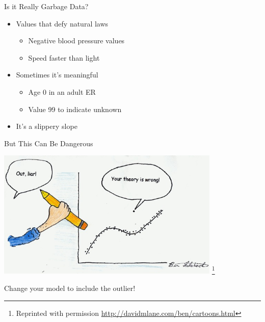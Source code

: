 \documentclass[aspectratio=169]{beamer}
\begin{document}
\begin{frame}{Is it Really Garbage Data?}

\begin{itemize}
\item Values that defy natural laws
        \begin{itemize}
        	\item Negative blood pressure values
	\item Speed faster than light
        \end{itemize}
\item Sometimes it's meaningful
        \begin{itemize}
        	\item Age 0 in an adult ER
	\item Value 99 to indicate unknown
        \end{itemize}
\item It's a slippery slope  
\end{itemize}



\end{frame}
\begin{frame}{But This Can Be Dangerous}

\includegraphics[width=0.8\textwidth]{lectOutliers/outlier_pic_1.jpg}
\footnote{Reprinted with permission 
\url{http://davidmlane.com/ben/cartoons.html}
}

Change your model to include the outlier!

\end{frame}
\end{document}
